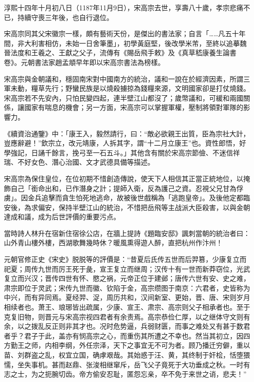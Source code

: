 淳熙十四年十月初八日（1187年11月9日），宋高宗去世，享壽八十歲，孝宗悲痛不已，持續守喪三年後，也自行退位。

宋高宗同其父宋徽宗一樣，頗有藝術天份，是傑出的書法家；自言「……凡五十年間，非大利害相仿，未始一日舍筆墨」，初學黃庭堅，後改學米芾，至終以追摹魏晉法度和王羲之、王獻之父子，流傳有《賜岳飛手敕》及《真草嵇康養生論書卷》。元朝書法家趙孟頫早年即以宋高宗書法為榜樣。

宋高宗與金朝議和，穩固南宋對中國南方的統治，議和一說在於經濟因素，所謂三軍未動，糧草先行；野蠻民族是以燒殺擄掠為錢糧來源，文明國家卻是打仗燒錢。宋高宗若不先安內，只怕民變四起，連半壁江山都沒了；歲幣議和，可緩和兩國關係，讓國家有喘息的機會；另一方面，宋高宗可以掌握軍權，壓制將領對軍隊的影響力。

《續資治通鑒》中：「康王入，毅然請行，曰：“敵必欲親王出質，臣為宗社大計，豈應辭避！”欽宗立，改元靖康，人拆其字，謂“十二月立康王”也。資性郎悟，好學強記，日誦千餘言，挽弓至一石五斗。」其他含有關於宋高宗節儉、不迷信祥瑞、不好女色、潛心治國、文才武德具備等描述。

宋高宗為保住皇位，在位初期不惜創造傳說，使天下人相信其正當正統地位，以掩飾自己「銜命出和，已作潛身之計；提師入衛，反為護己之資。忍視父兄甘為俘虜」。因金兵追擊而貪生怕死地逃命，故被後世戲稱為「逃跑皇帝」。及後他定都臨安後，為求偏安，保持半壁江山的統治，不惜把岳飛等主战派大臣殺害，以與金朝達成和議，成为后世評價的重要污点。

當時詩人林升在宿新住宿徐公店，在牆上提詩《題臨安邸》諷刺當朝的統治者曰：山外青山樓外樓，西湖歌舞幾時休？暖風熏得遊人醉，直把杭州作汴州！

元朝官修正史《宋史》脱脱等的評價是：“昔夏后氏传五世而后羿篡，少康复立而祀夏；周传九世而厉王死于彘，宣王复立而继周；汉传十有一世而新莽窃位，光武复立而兴汉；晋传四世有怀、愍之祸，元帝正位于建邺；唐传六世有安、史之难，肃宗即位于灵武；宋传九世而徽、钦陷于金，高宗缵图于南京：六君者，史皆称为中兴，而有异同焉。夏经羿、浞，周历共和，汉间新室、更始，晋、唐、宋则岁月相续者也。萧王、琅琊皆出疏属，少康、宣王、肃宗、高宗则父子相承者也。至于克复旧物，则晋元与宋高宗视四君者有余责焉。高宗恭俭仁厚，以之继体守文则有余，以之拨乱反正则非其才也。况时危势逼，兵弱财匮，而事之难处又有甚于数君者乎？君子于此，盖亦有悯高宗之心，而重伤其所遭之不幸也。然当其初立，因四方勤王之师，内相李纲，外任宗泽，天下之事宜无不可为者。顾乃播迁穷僻，重以苗、刘群盗之乱，权宜立国，确虖艰哉。其始惑于汪、黄，其终制于奸桧，恬堕猥懦，坐失事机。甚而赵鼎、张浚相继窜斥，岳飞父子竟死于大功垂成之秋。一时有志之士，为之扼腕切齿。帝方偷安忍耻，匿怨忘亲，卒不免于来世之诮，悲夫！”

